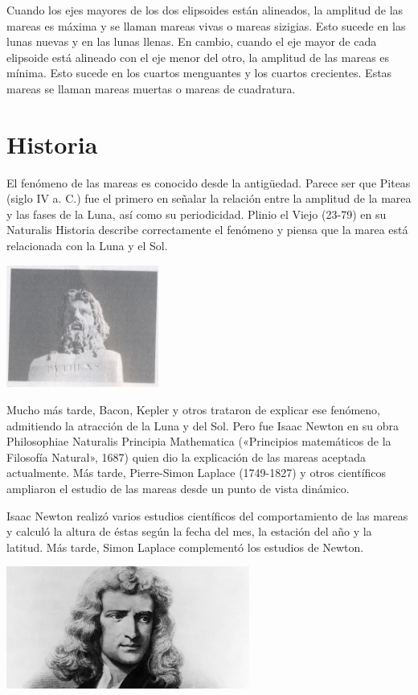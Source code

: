 \documentclass[12pt]{article}
\begin{document}
	 Cuando los ejes mayores de los dos elipsoides están alineados, la amplitud de las mareas es máxima y se llaman mareas vivas o mareas sizigias. Esto sucede en las lunas nuevas y en las lunas llenas. En cambio, cuando el eje mayor de cada elipsoide está alineado con el eje menor del otro, la amplitud de las mareas es mínima. Esto sucede en los cuartos menguantes y los cuartos crecientes. Estas mareas se llaman mareas muertas o mareas de cuadratura.
	 
	 
\section{Historia}	 
	 
	 El fenómeno de las mareas es conocido desde la antigüedad. Parece ser que Piteas (siglo IV a. C.) fue el primero en señalar la relación entre la amplitud de la marea y las fases de la Luna, así como su periodicidad. Plinio el Viejo (23-79) en su Naturalis Historia describe correctamente el fenómeno y piensa que la marea está relacionada con la Luna y el Sol. 

 
\begin{center}
	\includegraphics[width=5cm]{piteas.png}\\
\end{center}	 
	 
	 Mucho más tarde, Bacon, Kepler y otros trataron de explicar ese fenómeno, admitiendo la atracción de la Luna y del Sol. Pero fue Isaac Newton en su obra Philosophiae Naturalis Principia Mathematica («Principios matemáticos de la Filosofía Natural», 1687) quien dio la explicación de las mareas aceptada actualmente. Más tarde, Pierre-Simon Laplace (1749-1827) y otros científicos ampliaron el estudio de las mareas desde un punto de vista dinámico.

Isaac Newton realizó varios estudios científicos del comportamiento de las mareas y calculó la altura de éstas según la fecha del mes, la estación del año y la latitud. Más tarde, Simon Laplace complementó los estudios de Newton.
	 
	 \begin{center}
	\includegraphics[width=8cm]{niuton.jpg}\\
\end{center}	 
	 
\end{document}
